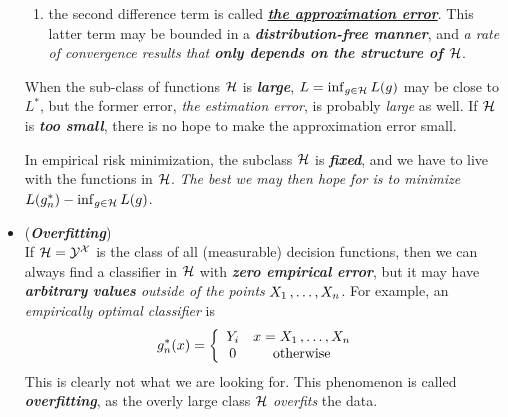 \documentclass[11pt]{article}
\begin{document}
\begin{itemize}
\begin{remark}
\begin{enumerate}
\item the second difference term is called \underline{\emph{\textbf{the approximation error}}}. This latter term may be bounded in a \emph{\textbf{distribution-free manner}}, and \emph{a rate of convergence results that \textbf{only depends on the structure of ${\mathcal H}$}}.
\end{enumerate}

When the sub-class of functions ${\mathcal H}$ is \emph{\textbf{large}}, $L = \inf_{g \in {\mathcal H}}L(g)$ may be close to $L^{*}$, but the former error, \emph{the estimation error}, is probably \emph{large} as well.  If ${\mathcal H}$ is \emph{\textbf{too small}}, there is no hope to make the approximation error small.

 In empirical risk minimization, the subclass ${\mathcal H}$ is \emph{\textbf{fixed}}, and we have to live with the functions in ${\mathcal H}$. \emph{The best we may then
hope for is to minimize $L(g_n^{*}) - \inf_{g \in {\mathcal H}}L(g)$}. 
\end{remark}

\item \begin{remark} (\emph{\textbf{Overfitting}})\\
If ${\mathcal H} = {\mathcal Y}^{{\mathcal X}}$ is the class of all (measurable) decision functions, then we can always find a classifier in ${\mathcal H}$ with \emph{\textbf{zero empirical error}}, but it may have \emph{\textbf{arbitrary values} outside of the points} $X_1 \,{,}\ldots{,}\, X_n$. For example, an \emph{empirically optimal classifier} is
\begin{align*}
g_{n}^{*}(x) &= \left\{ \begin{array}{cc}
Y_i & x = X_1 \,{,}\ldots{,}\, X_n\\
0 & \text{otherwise}
\end{array}
\right.
\end{align*} This is clearly not what we are looking for. This phenomenon is called \emph{\textbf{overfitting}}, as the overly large class ${\mathcal H}$ \emph{overfits} the data. 
\end{remark}

%


\end{itemize}
\end{document}
